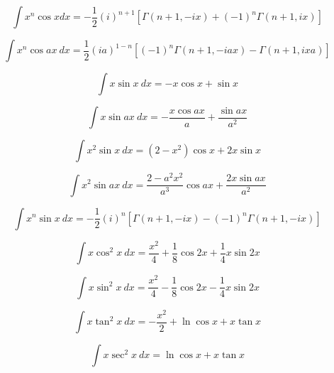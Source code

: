 \documentclass[12pt,letterpaper,leqno]{article}
\begin{document}
\begin{equation}
\int  x^n \cos x dx = 
-\frac{1}{2}(i)^{n+1}\left [ \Gamma(n+1, -ix) 
+ (-1)^n \Gamma(n+1, ix)\right] 
\end{equation}

\begin{equation}
\int x^n \cos ax \ dx =
 \frac{1}{2}(ia)^{1-n}\left [ (-1)^n  \Gamma(n+1, -iax) 
 -\Gamma(n+1, ixa)\right] 
\end{equation}

\begin{equation}
\int x \sin x\ dx = -x \cos x + \sin x 
\end{equation}

\begin{equation}
\int x \sin ax\ dx = -\frac{x \cos ax}{a} + \frac{\sin ax}{a^2} 
\end{equation}

\begin{equation}
\int x^2 \sin x\ dx = \left(2-x^2\right) \cos x + 2 x \sin x
\end{equation}

\begin{equation}
\int x^2 \sin ax\ dx =\frac{2-a^2x^2}{a^3}\cos ax +\frac{ 2 x \sin ax}{a^2} 
\end{equation}

\begin{equation}\label{eq:xul}
\int x^n \sin x \ dx = -\frac{1}{2}(i)^n\left[ \Gamma(n+1, -ix) 
 - (-1)^n\Gamma(n+1, -ix)\right] 
\end{equation}

\begin{equation}
\int x \cos^2 x \ dx = \frac{x^2}{4}+\frac{1}{8}\cos 2x + \frac{1}{4} x \sin 2x
\end{equation}

\begin{equation}
\int x \sin^2 x \ dx = \frac{x^2}{4}-\frac{1}{8}\cos 2x - \frac{1}{4} x \sin 2x
\end{equation}

\begin{equation}
\int x \tan^2 x \ dx = -\frac{x^2}{2} + \ln \cos x + x \tan x
\end{equation}

\begin{equation}
\int x \sec^2 x \ dx = \ln \cos x + x \tan x
\end{equation}
 
\end{document}

